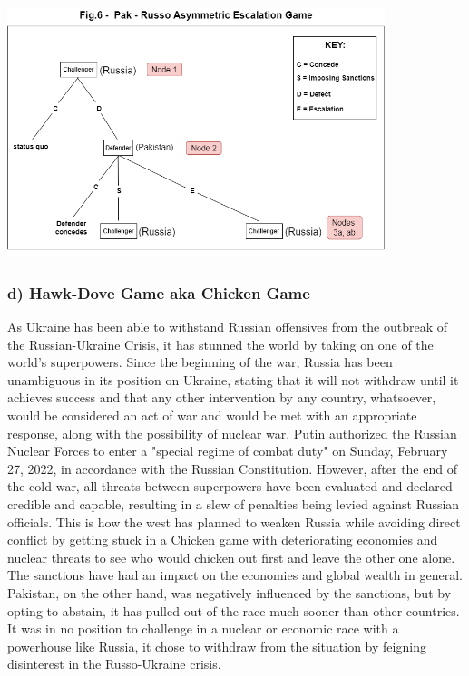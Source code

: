 \documentclass[runningheads]{llncs}
\begin{document}
\begin{center}
    \includegraphics[width=11cm]{russo-pak.png}
\end{center}

\subsubsection{d) Hawk-Dove Game aka Chicken Game}

As Ukraine has been able to withstand Russian offensives from the outbreak of the Russian-Ukraine Crisis, it has stunned the world by taking on one of the world's superpowers. Since the beginning of the war, Russia has been unambiguous in its position on Ukraine, stating that it will not withdraw until it achieves success and that any other intervention by any country, whatsoever, would be considered an act of war and would be met with an appropriate response, along with the possibility of nuclear war. Putin authorized the Russian Nuclear Forces to enter a "special regime of combat duty" on Sunday, February 27, 2022, in accordance with the Russian Constitution. However, after the end of the cold war, all threats between superpowers have been evaluated and declared credible and capable, resulting in a slew of penalties being levied against Russian officials. This is how the west has planned to weaken Russia while avoiding direct conflict by getting stuck in a Chicken game with deteriorating economies and nuclear threats to see who would chicken out first and leave the other one alone. The sanctions have had an impact on the economies and global wealth in general.
Pakistan, on the other hand, was negatively influenced by the sanctions, but by opting to abstain, it has pulled out of the race much sooner than other countries. It was in no position to challenge in a nuclear or economic race with a powerhouse like Russia, it chose to withdraw from the situation by feigning disinterest in the Russo-Ukraine crisis.
\end{document}
